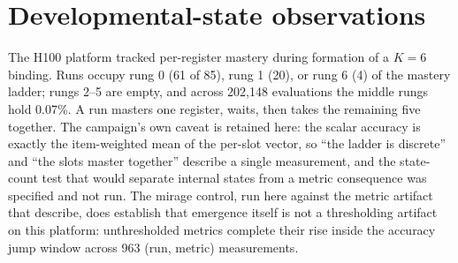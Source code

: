 \documentclass{article}
\begin{document}
\section{Developmental-state observations}
\label{sec:states}

The H100 platform tracked per-register mastery during formation of a $K=6$ binding. Runs
occupy rung 0 (61 of 85), rung 1 (20), or rung 6 (4) of the mastery ladder; rungs 2--5 are
empty, and across 202{,}148 evaluations the middle rungs hold 0.07\%. A run masters one
register, waits, then takes the remaining five together. The campaign's own caveat is
retained here: the scalar accuracy is exactly the item-weighted mean of the per-slot vector,
so ``the ladder is discrete'' and ``the slots master together'' describe a single
measurement, and the state-count test that would separate internal states from a metric
consequence was specified and not run. The mirage control, run here against the metric
artifact that \cite{schaeffer2023} describe, does
establish that emergence itself is not a thresholding artifact on this platform:
unthresholded metrics
complete their rise inside the accuracy jump window across 963 (run, metric) measurements.
\end{document}
